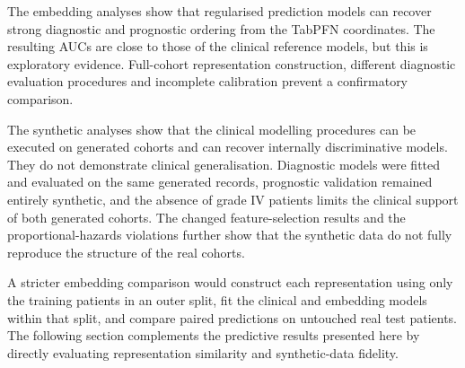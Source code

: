 The embedding analyses show that regularised prediction models can recover strong
diagnostic and prognostic ordering from the TabPFN coordinates.  The resulting
AUCs are close to those of the clinical reference models, but this is exploratory
evidence.  Full-cohort representation construction, different diagnostic
evaluation procedures and incomplete calibration prevent a confirmatory
comparison.

The synthetic analyses show that the clinical modelling procedures can be
executed on generated cohorts and can recover internally discriminative models.
They do not demonstrate clinical generalisation.  Diagnostic models were fitted
and evaluated on the same generated records, prognostic validation remained
entirely synthetic, and the absence of grade IV patients limits the clinical
support of both generated cohorts.  The changed feature-selection results and the
proportional-hazards violations further show that the synthetic data do not fully
reproduce the structure of the real cohorts.

A stricter embedding comparison would construct each representation using only
the training patients in an outer split, fit the clinical and embedding models
within that split, and compare paired predictions on untouched real test patients.
The following section complements the predictive results presented here by
directly evaluating representation similarity and synthetic-data fidelity.
